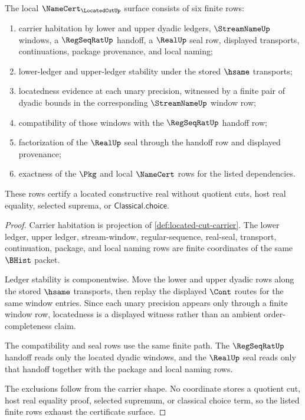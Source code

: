 \begin{theorem}
\label{thm:located-cut-namecert-obligations}
The local $\NameCert_{\LocatedCutUp}$ surface consists of six finite rows:
\begin{enumerate}
\item carrier habitation by lower and upper dyadic ledgers, $\StreamNameUp$ windows, a $\RegSeqRatUp$ handoff, a $\RealUp$ seal row, displayed transports, continuations, package provenance, and local naming;
\item lower-ledger and upper-ledger stability under the stored $\hsame$ transports;
\item locatedness evidence at each unary precision, witnessed by a finite pair of dyadic bounds in the corresponding $\StreamNameUp$ window row;
\item compatibility of those windows with the $\RegSeqRatUp$ handoff row;
\item factorization of the $\RealUp$ seal through the handoff row and displayed provenance;
\item exactness of the $\Pkg$ and local $\NameCert$ rows for the listed dependencies.
\end{enumerate}
These rows certify a located constructive real without quotient cuts, host real equality, selected suprema, or $\mathsf{Classical.choice}$.
\end{theorem}
\begin{proof}
Carrier habitation is projection of \autoref{def:located-cut-carrier}. The lower ledger, upper ledger, stream-window, regular-sequence, real-seal, transport, continuation, package, and local naming rows are finite coordinates of the same $\BHist$ packet.

Ledger stability is componentwise. Move the lower and upper dyadic rows along the stored $\hsame$ transports, then replay the displayed $\Cont$ routes for the same window entries. Since each unary precision appears only through a finite window row, locatedness is a displayed witness rather than an ambient order-completeness claim.

The compatibility and seal rows use the same finite path. The $\RegSeqRatUp$ handoff reads only the located dyadic windows, and the $\RealUp$ seal reads only that handoff together with the package and local naming rows.

The exclusions follow from the carrier shape. No coordinate stores a quotient cut, host real equality proof, selected supremum, or classical choice term, so the listed finite rows exhaust the certificate surface.
\end{proof}

